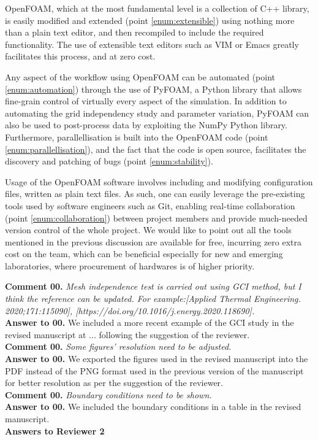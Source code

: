 \documentclass[12pt]{article}
\newcounter{question}
\newcommand{\name}{00}
\newcommand{\question}[1]{\stepcounter{question} \noindent \textbf{Comment \name.\thequestion} \emph{#1}\\}
\newcommand{\answer}[1]{\noindent \textbf{Answer to \name.\thequestion} #1 \mbox{}\\}
\newcommand{\newperson}[2]{\renewcommand{\name}{#2} \setcounter{question}{0} \noindent \textbf{\large Answers to #1} \\}
\begin{document}
{    OpenFOAM, which at the most fundamental level is a collection of C++ library, is easily modified and extended (point \ref{enum:extensible}) using nothing more than a plain text editor, and then recompiled to include the required functionality. The use of extensible text editors such as VIM or Emacs greatly facilitates this process, and at zero cost.

    Any aspect of the workflow using OpenFOAM can be automated (point \ref{enum:automation}) through the use of PyFOAM, a Python library that allows fine-grain control of virtually every aspect of the simulation. In addition to automating the grid independency study and parameter variation, PyFOAM can also be used to post-process data by exploiting the NumPy Python library. Furthermore, parallellisation is built into the OpenFOAM code (point \ref{enum:parallellisation}), and the fact that the code is open source, facilitates the discovery and patching of bugs (point \ref{enum:stability}).

    Usage of the OpenFOAM software involves including and modifying configuration files, written as plain text files. As such, one can easily leverage the pre-existing tools used by software engineers such as Git, enabling real-time collaboration (point \ref{enum:collaboration}) between project members and provide much-needed version control of the whole project. We would like to point out all the tools mentioned in the previous discussion are available for free, incurring zero extra cost on the team, which can be beneficial especially for new and emerging laboratories, where procurement of hardwares is of higher priority.
}

\question{Mesh independence test is carried out using GCI method, but I think the reference can be updated. For example:[Applied Thermal Engineering. 2020;171:115090], [https://doi.org/10.1016/j.energy.2020.118690].}

\answer{We included a more recent example of the GCI study in the revised manuscript at ... following the suggestion of the reviewer.}

\question{Some figures' resolution need to be adjusted.}

\answer{We exported the figures used in the revised manuscript into the PDF instead of the PNG format used in the previous version of the manuscript for better resolution as per the suggestion of the reviewer.}

\question{Boundary conditions need to be shown.}

\answer{We included the boundary conditions in a table in the revised manuscript.}
\newperson{Reviewer 2}{R2}
\end{document}
